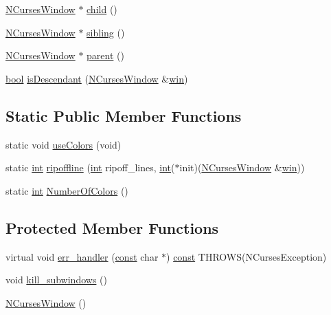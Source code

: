 \begin{DoxyCompactItemize}
\item 
\hyperlink{class_n_curses_window}{N\-Curses\-Window} $\ast$ \hyperlink{class_n_curses_window_ab303c8a57cef13dc8faec2f653c7c8cb}{child} ()
\item 
\hyperlink{class_n_curses_window}{N\-Curses\-Window} $\ast$ \hyperlink{class_n_curses_window_ab9e31dae65fe9964e91da4bcde098083}{sibling} ()
\item 
\hyperlink{class_n_curses_window}{N\-Curses\-Window} $\ast$ \hyperlink{class_n_curses_window_a060d3388577449baf1a03948f6957958}{parent} ()
\item 
\hyperlink{term__entry_8h_a002004ba5d663f149f6c38064926abac}{bool} \hyperlink{class_n_curses_window_a88432172ad4c076a9486a1703a399962}{is\-Descendant} (\hyperlink{class_n_curses_window}{N\-Curses\-Window} \&\hyperlink{_ndk_8cpp_a3b51c79a7f111d2be9d347ac9bfe3abd}{win})
\end{DoxyCompactItemize}
\subsection*{Static Public Member Functions}
\begin{DoxyCompactItemize}
\item 
static void \hyperlink{class_n_curses_window_a6cf48d32b78c5b11a47a4849669af6e8}{use\-Colors} (void)
\item 
static \hyperlink{term__entry_8h_ad65b480f8c8270356b45a9890f6499ae}{int} \hyperlink{class_n_curses_window_af84cac5b8bec92db9ebacd43f450631c}{ripoffline} (\hyperlink{term__entry_8h_ad65b480f8c8270356b45a9890f6499ae}{int} ripoff\-\_\-lines, \hyperlink{term__entry_8h_ad65b480f8c8270356b45a9890f6499ae}{int}($\ast$init)(\hyperlink{class_n_curses_window}{N\-Curses\-Window} \&\hyperlink{_ndk_8cpp_a3b51c79a7f111d2be9d347ac9bfe3abd}{win}))
\item 
static \hyperlink{term__entry_8h_ad65b480f8c8270356b45a9890f6499ae}{int} \hyperlink{class_n_curses_window_ae6d17b7defdd6ef0aca5d5244b554612}{Number\-Of\-Colors} ()
\end{DoxyCompactItemize}
\subsection*{Protected Member Functions}
\begin{DoxyCompactItemize}
\item 
virtual void \hyperlink{class_n_curses_window_a7a9dd0b35ce34fd358d9dde3c369d3b9}{err\-\_\-handler} (\hyperlink{term__entry_8h_a57bd63ce7f9a353488880e3de6692d5a}{const} char $\ast$) \hyperlink{term__entry_8h_a57bd63ce7f9a353488880e3de6692d5a}{const} T\-H\-R\-O\-W\-S(N\-Curses\-Exception)
\item 
void \hyperlink{class_n_curses_window_a71a8ae4943745624e62de16353c16172}{kill\-\_\-subwindows} ()
\item 
\hyperlink{class_n_curses_window_a54e025337e5f0cb21fdb563d74d03766}{N\-Curses\-Window} ()
\end{DoxyCompactItemize}

